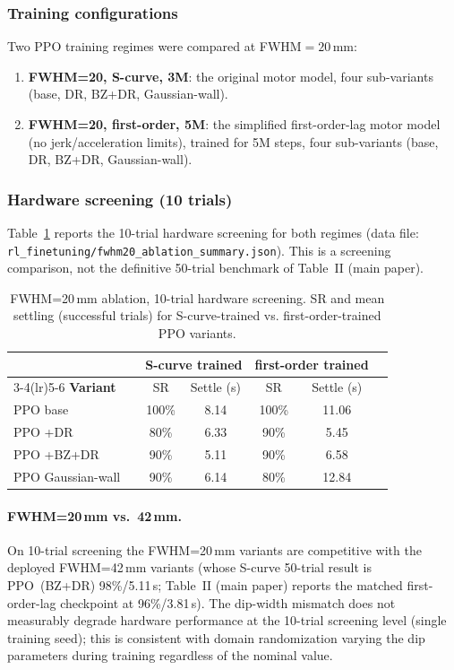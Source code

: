 \subsubsection{Training configurations}

Two PPO training regimes were compared at FWHM$=20$\,mm:
\begin{enumerate}
  \item \textbf{FWHM=20, S-curve, 3M}: the original motor model,
    four sub-variants (base, DR, BZ+DR, Gaussian-wall).
  \item \textbf{FWHM=20, first-order, 5M}: the simplified
    first-order-lag motor model (no jerk/acceleration limits), trained
    for 5M steps, four sub-variants (base, DR, BZ+DR, Gaussian-wall).
\end{enumerate}

\subsubsection{Hardware screening (10 trials)}

Table~\ref{tab:fwhm20_hw_10t} reports the 10-trial hardware screening
for both regimes (data file: \texttt{rl\_finetuning/fwhm20\_ablation\_summary.json}).
This is a screening comparison, not the definitive 50-trial benchmark
of Table~II (main paper).

\begin{table}[!t]
\centering
\renewcommand{\arraystretch}{1.15}
\caption{FWHM=20\,mm ablation, 10-trial hardware screening.
  SR and mean settling (successful trials) for S-curve-trained vs.
  first-order-trained PPO variants.}
\label{tab:fwhm20_hw_10t}
\begin{tabular}{lcccc cc}
\toprule
 & & \multicolumn{2}{c}{\textbf{S-curve trained}} & \multicolumn{2}{c}{\textbf{first-order trained}} \\
\cmidrule(lr){3-4}\cmidrule(lr){5-6}
\textbf{Variant} & & SR & Settle (s) & SR & Settle (s) \\
\midrule
PPO base          & & 100\% & 8.14 & 100\% & 11.06 \\
PPO +DR           & &  80\% & 6.33 &  90\% &  5.45 \\
PPO +BZ+DR        & &  90\% & 5.11 &  90\% &  6.58 \\
PPO Gaussian-wall & &  90\% & 6.14 &  80\% & 12.84 \\
\bottomrule
\end{tabular}
\end{table}

\paragraph{FWHM=20\,mm vs.\ 42\,mm.}
On 10-trial screening the FWHM=20\,mm variants are competitive with
the deployed FWHM=42\,mm variants (whose S-curve 50-trial result is
PPO~(BZ+DR) 98\%/5.11\,s; Table~II (main paper) reports the matched
first-order-lag checkpoint at 96\%/3.81\,s). The dip-width
mismatch does not measurably degrade hardware performance at the 10-trial screening level (single training seed);
this is consistent with domain randomization varying the dip parameters
during training regardless of the nominal value.


